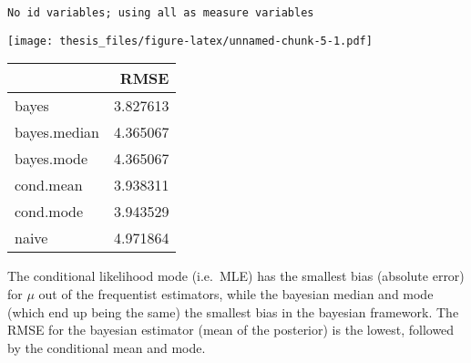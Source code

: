 \documentclass[12pt,twoside]{dukestatscithesis}
\theoremstyle{definition}
\theoremstyle{definition}
\theoremstyle{definition}
\theoremstyle{remark}
\begin{document}
\begin{verbatim}
No id variables; using all as measure variables
\end{verbatim}
\texttt{[image: thesis\_files/figure-latex/unnamed-chunk-5-1.pdf]}
\begin{Shaded}
\begin{Highlighting}[]
\NormalTok{(}\NormalTok{(} \NormalTok{(}\OperatorTok{$}\OperatorTok{^}\NormalTok{)), } \NormalTok{(}\OperatorTok{$}\OperatorTok{^}\NormalTok{)), } \NormalTok{(}\OperatorTok{$}\OperatorTok{^}\NormalTok{)),} \NormalTok{(}\OperatorTok{$}\OperatorTok{^}\NormalTok{)), } \NormalTok{(}\OperatorTok{$}\OperatorTok{^}\NormalTok{)), } \NormalTok{(}\OperatorTok{$}\OperatorTok{^}\NormalTok{))), } \NormalTok{)}
\end{Highlighting}
\end{Shaded}
\begin{tabular}{l|r}
\hline
  & RMSE\\
\hline
bayes & 3.827613\\
\hline
bayes.median & 4.365067\\
\hline
bayes.mode & 4.365067\\
\hline
cond.mean & 3.938311\\
\hline
cond.mode & 3.943529\\
\hline
naive & 4.971864\\
\hline
\end{tabular}
The conditional likelihood mode (i.e.~MLE) has the smallest bias
(absolute error) for \(\mu\) out of the frequentist estimators, while
the bayesian median and mode (which end up being the same) the smallest
bias in the bayesian framework. The RMSE for the bayesian estimator
(mean of the posterior) is the lowest, followed by the conditional mean
and mode.
\end{document}
